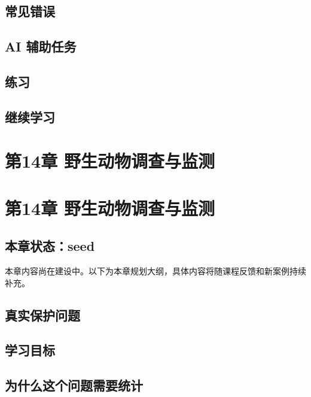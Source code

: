 \documentclass[
  letterpaper,
]{scrbook}
\begin{document}
\section{常见错误}\label{ux5e38ux89c1ux9519ux8bef-10}

\section{AI 辅助任务}\label{ai-ux8f85ux52a9ux4efbux52a1-4}

\section{练习}\label{ux7ec3ux4e60-12}

\section{继续学习}\label{ux7ee7ux7eedux5b66ux4e60-4}

\chapter{第14章
野生动物调查与监测}\label{ux7b2c14ux7ae0-ux91ceux751fux52a8ux7269ux8c03ux67e5ux4e0eux76d1ux6d4b}

\chapter{第14章
野生动物调查与监测}\label{ux7b2c14ux7ae0-ux91ceux751fux52a8ux7269ux8c03ux67e5ux4e0eux76d1ux6d4b-1}

\section{本章状态：seed}\label{ux672cux7ae0ux72b6ux6001seed-4}

本章内容尚在建设中。以下为本章规划大纲，具体内容将随课程反馈和新案例持续补充。

\section{真实保护问题}\label{ux771fux5b9eux4fddux62a4ux95eeux9898-10}

\section{学习目标}\label{ux5b66ux4e60ux76eeux6807-7}

\section{为什么这个问题需要统计}\label{ux4e3aux4ec0ux4e48ux8fd9ux4e2aux95eeux9898ux9700ux8981ux7edfux8ba1-4}
\end{document}

